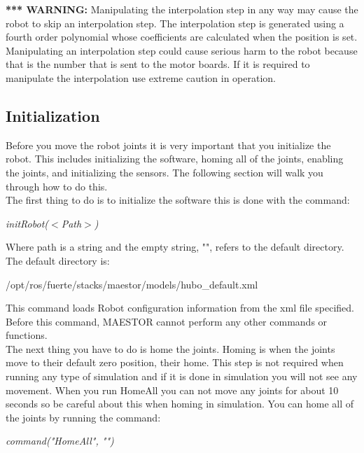 \documentclass[12pt]{article}
\begin{document}
\textbf{*** WARNING:} Manipulating the interpolation step in any way may cause the robot to skip an interpolation step. The interpolation step is generated using a fourth order polynomial whose coefficients are calculated when the position is set. Manipulating an interpolation step could cause serious harm to the robot because that is the number that is sent to the motor boards. If it is required to manipulate the interpolation use extreme caution in operation. 

\subsection{Initialization}

Before you move the robot joints it is very important that you initialize the robot. This includes initializing the software, homing all of the joints, enabling the joints, and initializing the sensors. The following section will walk you through how to do this.\\

The first thing to do is to initialize the software this is done with the command:
	\begin{center}
		\textit{initRobot($<$Path$>$)}
	\end{center}

Where path is a string and the empty string, "", refers to the default directory. The default directory is:
 
\begin{center}
	/opt/ros/fuerte/stacks/maestor/models/hubo\_default.xml
\end{center}

This command loads Robot configuration information from the xml file specified. 
Before this command, MAESTOR cannot perform any other commands or functions.\\

The next thing you have to do is home the joints. Homing is when the joints move to their default zero position, their home. This step is not required when running any type of simulation and if it is done in simulation you will not see any movement. When you run HomeAll you can not move any joints for about 10 seconds so be careful about this when homing in simulation. You can home all of the joints by running the command:

	\begin{center}
		\textit{command("HomeAll", "")}
	\end{center}
\end{document}
